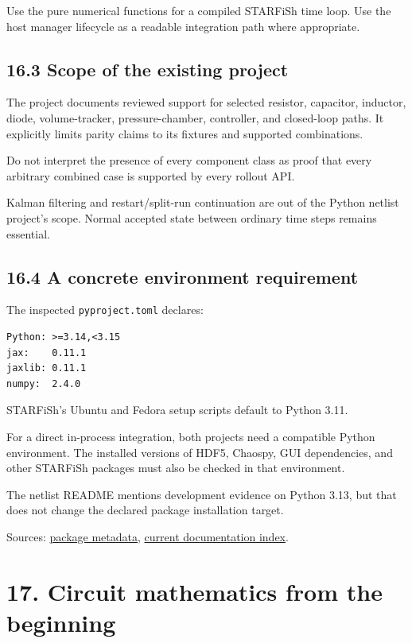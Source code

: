 \documentclass[11pt,a4paper]{article}
\begin{document}
Use the pure numerical functions for a compiled STARFiSh time loop. Use the host manager lifecycle as a readable integration path where appropriate.

\subsection{16.3 Scope of the existing project}
The project documents reviewed support for selected resistor, capacitor, inductor, diode, volume-tracker, pressure-chamber, controller, and closed-loop paths. It explicitly limits parity claims to its fixtures and supported combinations.

Do not interpret the presence of every component class as proof that every arbitrary combined case is supported by every rollout API.

Kalman filtering and restart/split-run continuation are out of the Python netlist project's scope. Normal accepted state between ordinary time steps remains essential.

\subsection{16.4 A concrete environment requirement}
The inspected \texttt{pyproject.\allowbreak{}toml} declares:


\begin{lstlisting}
Python: >=3.14,<3.15
jax:    0.11.1
jaxlib: 0.11.1
numpy:  2.4.0
\end{lstlisting}
STARFiSh's Ubuntu and Fedora setup scripts default to Python 3.11.

For a direct in-process integration, both projects need a compatible Python environment. The installed versions of HDF5, Chaospy, GUI dependencies, and other STARFiSh packages must also be checked in that environment.

The netlist README mentions development evidence on Python 3.13, but that does not change the declared package installation target.

Sources: \href{/home/sadid/crimson/cfs_reg/CRIMSONFlowsolver/flowsolver/netlist_py/pyproject.toml}{package metadata}, \href{/home/sadid/crimson/cfs_reg/CRIMSONFlowsolver/flowsolver/netlist_py/docs/README.md}{current documentation index}.

\clearpage
\section{17. Circuit mathematics from the beginning}
\end{document}
